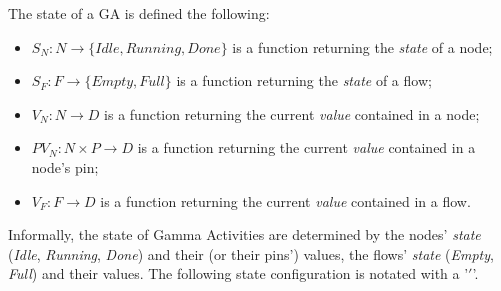 \begin{definition}
	The state of a GA is defined the following:
	
	\begin{itemize}
		\item \(S_N : N \rightarrow \{ \mathit{Idle}, \mathit{Running}, \mathit{Done} \} \) is a function returning the \emph{state} of a node;
		\item \(S_F : F \rightarrow \{ \mathit{Empty}, \mathit{Full} \} \) is a function returning the \emph{state} of a flow;
		\item \(V_N : N \rightarrow D \) is a function returning the current \emph{value} contained in a node;
		\item \(\mathit{PV}_N : N \times P \rightarrow D \) is a function returning the current \emph{value} contained in a node's pin;
		\item \(V_F : F \rightarrow D \) is a function returning the current \emph{value} contained in a flow.
	\end{itemize}

Informally, the state of Gamma Activities are determined by the nodes' \emph{state} (\emph{Idle}, \emph{Running}, \emph{Done}) and their (or their pins') values, the flows' \emph{state} (\emph{Empty}, \emph{Full}) and their values. The following state configuration is notated with a '$\prime$'.
	
\end{definition}

